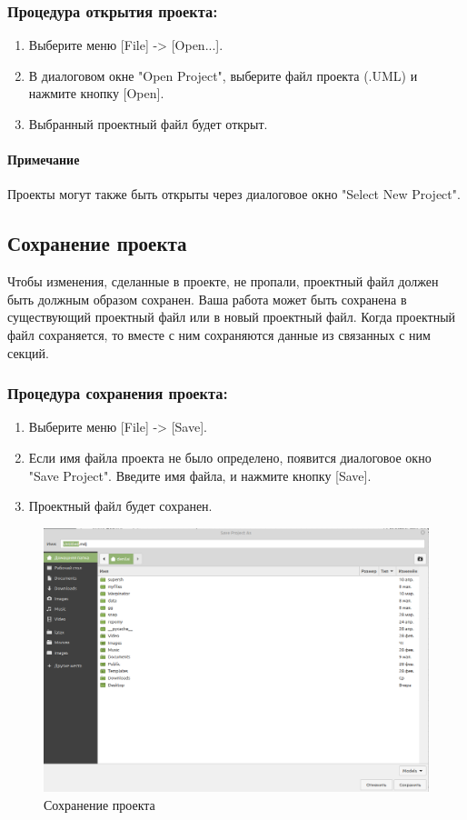 \documentclass[a4paper,12pt]{report}
\begin{document}
\subsubsection*{Процедура открытия проекта:}
\begin{enumerate}
	\item Выберите меню [File] -> [Open...].
	\item В диалоговом окне "Open Project", выберите файл проекта (.UML) и нажмите кнопку
	[Open].
	\item Выбранный проектный файл будет открыт.
\end{enumerate}

\paragraph{Примечание}
Проекты могут также быть открыты через диалоговое окно "Select New Project".

\subsection*{Сохранение проекта}
Чтобы изменения, сделанные в проекте, не пропали, проектный файл должен быть должным
образом сохранен. Ваша работа может быть сохранена в существующий проектный файл или в 
новый проектный файл. Когда проектный файл сохраняется, то вместе с ним сохраняются данные
из связанных с ним секций.
\subsubsection*{Процедура сохранения проекта:}
\begin{enumerate}
	\item Выберите меню [File] -> [Save].
	\item Если имя файла проекта не было определено, появится диалоговое окно "Save Project".
	Введите имя файла, и нажмите кнопку [Save].
	\item Проектный файл будет сохранен.
\end{enumerate}


\begin{figure}[h!]
	\centering
	\includegraphics[width=0.5\linewidth]{images/saveproject}
	\caption{Сохранение проекта}
	\label{fig:saveproject}
\end{figure}
\end{document}
